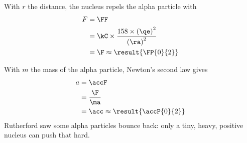 \begin{abcliste}
\abc With $r$ the distance, the nucleus repels the alpha particle with
\begin{align}
 F &= \FF \\
   &= \kC\times\frac{158\times\left(\qe\right)^2}{\left(\ra\right)^2} \\
   &= \F \approx \result{\FP{0}{2}}
\end{align}

\abc With $m$ the mass of the alpha particle, Newton's second law gives
\begin{align}
 a &= \accF \\
   &= \frac{\F}{\ma} \\
   &= \acc \approx \result{\accP{0}{2}}
\end{align}
Rutherford saw some alpha particles bounce back: only a tiny, heavy, positive nucleus can push that hard.
\end{abcliste}
